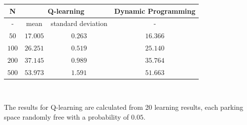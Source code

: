 \begin{center}
	\begin{tabular}{ |c|c|c|c| } 
		\hline
		N& \multicolumn{2}{c|}{Q-learning} & Dynamic Programming\\ 
		\hline
		-& mean & standard deviation & -\\ 
		\hline
		$50$ & $17.005$ & $0.263$ & $16.366$ \\ 
		\hline
		$100$ & $26.251$ & $0.519$ & $25.140$ \\ 
		\hline
		$200$ & $37.145$ & $0.989$ & $35.764$ \\ 
		\hline
		$500$ & $53.973$ & $1.591$ & $51.663$ \\ 
		\hline	
	\end{tabular}\\
\end{center}

The results for Q-learning are calculated from 20 learning results, each parking space randomly free with a probability of $0.05$.
